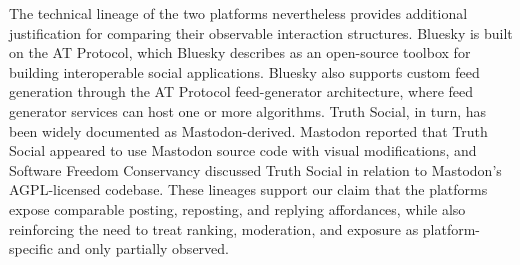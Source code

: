 \documentclass[letterpaper]{article} %
\begin{document}
The technical lineage of the two platforms nevertheless provides additional justification for comparing their observable interaction structures. Bluesky is built on the AT Protocol, which Bluesky describes as an open-source toolbox for building interoperable social applications. Bluesky also supports custom feed generation through the AT Protocol feed-generator architecture, where feed generator services can host one or more algorithms. Truth Social, in turn, has been widely documented as Mastodon-derived. Mastodon reported that Truth Social appeared to use Mastodon source code with visual modifications, and Software Freedom Conservancy discussed Truth Social in relation to Mastodon’s AGPL-licensed codebase. These lineages support our claim that the platforms expose comparable posting, reposting, and replying affordances, while also reinforcing the need to treat ranking, moderation, and exposure as platform-specific and only partially observed. 
\end{document}
